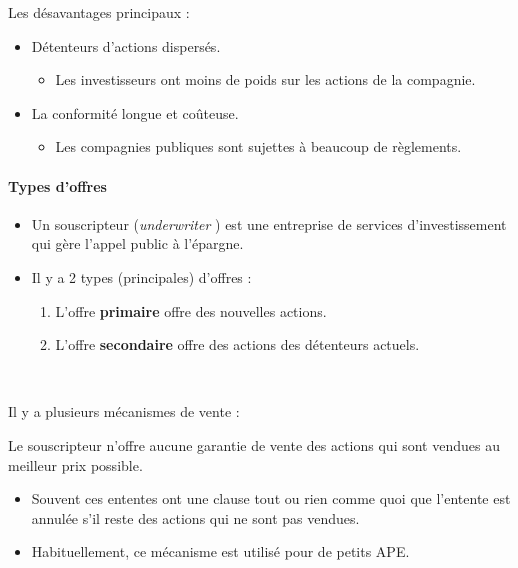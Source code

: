 \documentclass[10pt, french]{article}
\begin{document}
\begin{multicols*}{2}
Les désavantages principaux :
\begin{itemize}
	\item	Détenteurs d'actions dispersés.
		\begin{itemize}
		\item	Les investisseurs ont moins de poids sur les actions de la compagnie.
		\end{itemize}
	\item	La conformité longue et coûteuse.
		\begin{itemize}
		\item	Les compagnies publiques sont sujettes à beaucoup de règlements.
		\end{itemize}
\end{itemize}


\paragraph{Types d'offres}
\begin{itemize}
	\item	Un souscripteur (\og \textit{underwriter} \fg{}) est une entreprise de services d'investissement qui gère l'appel public à l'épargne.
	\item	Il y a 2 types (principales) d'offres : 
		\begin{enumerate}
		\item	L'offre \textbf{primaire} offre des nouvelles actions.
		\item	L'offre \textbf{secondaire} offre des actions des détenteurs actuels.
		\end{enumerate}
\end{itemize}

\

Il y a plusieurs mécanismes de vente :

\begin{definitionNOHFILLsub}
Le souscripteur n'offre aucune garantie de vente des actions qui sont vendues au meilleur prix possible.
\begin{itemize}
	\item	Souvent ces ententes ont une clause tout ou rien comme quoi que l'entente est annulée s'il reste des actions qui ne sont pas vendues.
	\item	Habituellement, ce mécanisme est utilisé pour de petits APE.
\end{itemize}
\end{definitionNOHFILLsub}


\end{multicols*}
\end{document}
